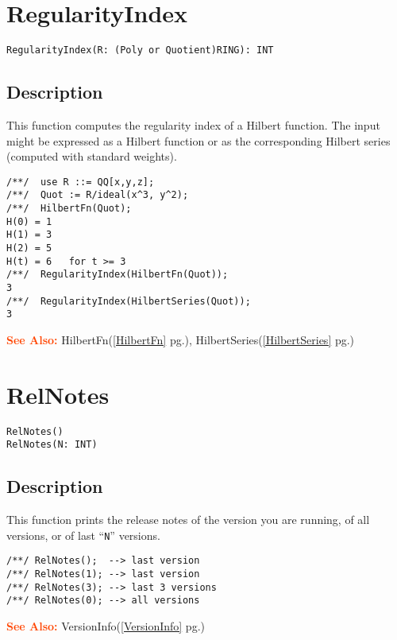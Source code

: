 \documentclass[a4paper]{mybook}
\newenvironment{command}{}{} %
\newcommand\SeeAlso{\par\textcolor{OrangeRed}{\textbf{\large See Also: }}}
\begin{document}
\section{RegularityIndex}
\label{RegularityIndex}
\begin{command} %


\begin{Verbatim}[label=syntax, rulecolor=\color{MidnightBlue},
frame=single]
RegularityIndex(R: (Poly or Quotient)RING): INT
\end{Verbatim}


\subsection*{Description}

This function computes the regularity index of a Hilbert function.
The input might be expressed as a Hilbert function or as the
corresponding Hilbert series (computed with standard weights).
\begin{Verbatim}[label=example, rulecolor=\color{PineGreen}, frame=single]
/**/  use R ::= QQ[x,y,z];
/**/  Quot := R/ideal(x^3, y^2);
/**/  HilbertFn(Quot);
H(0) = 1
H(1) = 3
H(2) = 5
H(t) = 6   for t >= 3
/**/  RegularityIndex(HilbertFn(Quot));
3
/**/  RegularityIndex(HilbertSeries(Quot));
3
\end{Verbatim}


\SeeAlso %
  HilbertFn(\ref{HilbertFn} pg.\pageref{HilbertFn}), 
    HilbertSeries(\ref{HilbertSeries} pg.\pageref{HilbertSeries})
\end{command} %

\section{RelNotes}
\label{RelNotes}
\begin{command} %


\begin{Verbatim}[label=syntax, rulecolor=\color{MidnightBlue},
frame=single]
RelNotes()
RelNotes(N: INT)
\end{Verbatim}


\subsection*{Description}

This function prints the release notes of the version you are running,
of all versions, or of last ``\verb&N&'' versions.
\begin{Verbatim}[label=example, rulecolor=\color{PineGreen}, frame=single]
/**/ RelNotes();  --> last version
/**/ RelNotes(1); --> last version
/**/ RelNotes(3); --> last 3 versions
/**/ RelNotes(0); --> all versions
\end{Verbatim}


\SeeAlso %
  VersionInfo(\ref{VersionInfo} pg.\pageref{VersionInfo})
\end{command} %
\end{document}

